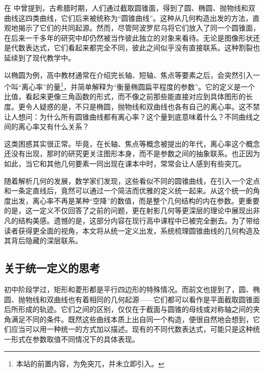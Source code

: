 
\begin{issues}
\issueDraft
\end{issues}


在 中曾提到，古希腊时期，人们通过截取圆锥面，得到了圆、椭圆、抛物线和双曲线这四类曲线，它们后来被统称为“圆锥曲线”。这种从几何构造出发的方法，直观地揭示了它们的共同起源。然而，尽管阿波罗尼乌将它们放入了同一个圆锥面，在后来一千多年的研究中却仍然被当作彼此独立的对象来看待。无论是图像形状还是代数表达式，它们看起来都完全不同，彼此之间似乎没有直接联系。这种割裂也延续到了现代教学中。

以椭圆为例，高中教材通常在介绍完长轴、短轴、焦点等要素之后，会突然引入一个叫“离心率”的量\footnote{本站的前置内容，为免突兀，并未立即引入。}，并简单解释为“衡量椭圆扁平程度的参数”。它的定义是一个比值，看起来更像三角函数的形式，而不像之前那些能直接对应到具体图形的长度。更令人疑惑的是，不只是椭圆，抛物线和双曲线也各有自己的离心率。这不禁让人想问：为什么所有圆锥曲线都有离心率？这个量到底意味着什么？不同曲线之间的离心率又有什么关系？

这类困惑其实很正常。毕竟，在长轴、焦点等概念被提出的年代，离心率这个概念还没有出现，那时的研究更关注图形本身，而不是参数之间的抽象联系。也正因为如此，当它和其他几何要素一同出现在课本中时，常常会让人感到有些突兀。

随着解析几何的发展，数学家们发现，这些看似不同的圆锥曲线，在引入一个定点和一条定直线后，竟然可以通过一个简洁而优雅的定义统一起来。从这个统一的角度出发，离心率不再是某种“空降”的数值，而是整个几何结构的内在参数。更重要的是，这一定义不仅回答了之前的问题，更在射影几何等更深层的理论中展现出非凡的结构美感。遗憾的是，这部分内容在现行高中课程中已被完全删去。为了带给读者获得更全面的视角，本文将从统一定义出发，系统梳理圆锥曲线的几何构造及其背后隐藏的深层联系。


\subsection{关于统一定义的思考}

初中阶段学过，矩形和菱形都是平行四边形的特殊情况。而前文也提到了，圆、椭圆、抛物线和双曲线也有着相同的几何起源——它们都可以看作是平面截取圆锥面后所形成的轨迹。它们之间的区别，仅仅在于截面与圆锥的母线或对称轴之间的夹角满足不同的条件。既然这些曲线本质上出自同一个构造，便很自然地会想到，它们应当可以用一种统一的方式加以描述。现有的不同代数表达式，可能只是这种统一形式在参数取值不同情况下的具体表现。

